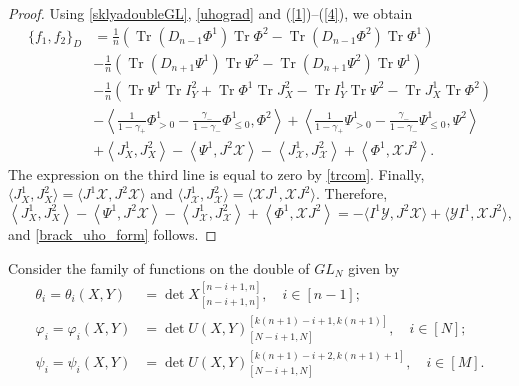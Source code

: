 \documentclass{amsart}
\theoremstyle{definition}
\theoremstyle{remark}
\numberwithin{equation}{section}
\numberwithin{theorem}{section}
\begin{document}
\begin{proof}
Using \eqref{sklyadoubleGL}, \eqref{uhograd} and (\ref{1})--(\ref{4}), 
we obtain
\begin{align*}
\{f_1,f_2\}_D &=
 \frac{1}{n} \left ({\operatorname{Tr}}(D_{n-1} {\Phi}^1) {\operatorname{Tr}}{\Phi}^2 - {\operatorname{Tr}}(D_{n-1} {\Phi}^2) {\operatorname{Tr}}{\Phi}^1 \right)\\
&  - \frac{1}{n} \left ({\operatorname{Tr}}(D_{n+1} {\Psi}^1) {\operatorname{Tr}}{\Psi}^2 - {\operatorname{Tr}}(D_{n+1} {\Psi}^2) {\operatorname{Tr}}{\Psi}^1 \right) \\
&  -\frac{1}{n} \left ({\operatorname{Tr}}{\Psi}^1 {\operatorname{Tr}} I_Y^2+{\operatorname{Tr}}{\Phi}^1 {\operatorname{Tr}} J_X^2 - {\operatorname{Tr}} I_Y^1 {\operatorname{Tr}}{\Psi}^2 - 
{\operatorname{Tr}} J_X^1  {\operatorname{Tr}}{\Phi}^2 \right) \\
&  - \left \langle  \frac{1}{1-\gamma_+} 
{\Phi}^1_{>0} - \frac{\gamma_-}{1-\gamma_-}{\Phi}^1_{\leq 0}, {\Phi}^2 \right \rangle
+ \left \langle  \frac{1}{1-\gamma_+} 
{\Psi}^1_{>0} - \frac{\gamma_-}{1-\gamma_-}{\Psi}^1_{\leq 0}, {\Psi}^2 \right \rangle\\ 
& 
+\left \langle  
J^1_X, J_X^2 \right \rangle -
\left \langle  
{\Psi}^1, J^2{{\mathcal X}}\right\rangle 
-\left \langle  
J^1_{{\mathcal X}}, J_{{\mathcal X}}^2 \right \rangle
+\left \langle {\Phi}^1, {{\mathcal X}} J^2\right \rangle.
\end{align*}
The expression on the third line is equal to zero by \eqref{trcom}. Finally,
$\langle J^1_X,J^2_X\rangle=\langle J^1{{\mathcal X}},J^2{{\mathcal X}}\rangle$ and $\langle J^1_{{\mathcal X}}, J^2_{{\mathcal X}}\rangle
=\langle {{\mathcal X}} J^1,{{\mathcal X}} J^2\rangle$. Therefore,
\[
\left \langle  J^1_X, J_X^2 \right \rangle -\left \langle  {\Psi}^1, J^2{{\mathcal X}}\right\rangle 
-\left \langle  J^1_{{\mathcal X}}, J_{{\mathcal X}}^2 \right \rangle+\left \langle {\Phi}^1, {{\mathcal X}} J^2\right \rangle=
-\langle I^1{{\mathcal Y}},J^2{{\mathcal X}}\rangle + \langle {{\mathcal Y}} I^1, {{\mathcal X}} J^2\rangle,
\]
and \eqref{brack_uho_form} follows.
\end{proof}

Consider the family of functions on the double of $GL_N$ given by
\begin{equation}\nonumber
 \begin{aligned}
{{\theta}}_i={{\theta}}_i(X,Y)&=\det X_{[n-i+1,n]}^{[n-i+1,n]}, \quad i\in [n-1];\\
{{\varphi}}_i={{\varphi}}_i(X,Y)&=\det U(X,Y)_{[N-i+1, N]}^{[k (n+1) - i +1, k (n+1)]}, \quad i\in [N];\\
{{\psi}}_i={{\psi}}_i(X,Y)&=\det U(X,Y)_{[N-i+1, N]}^{[k (n+1) - i +2, k (n+1)+1]}, \quad i\in [M].
\end{aligned}
\end{equation}
\end{document}
